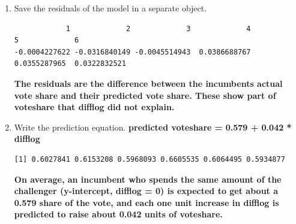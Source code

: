 \documentclass[12pt,letterpaper]{article}
\begin{document}
\begin{enumerate}
		\item Save the residuals of the model in a separate object.	

\begin{verbatim}
            1             2             3             4             5             6 
-0.0004227622 -0.0316840149 -0.0045514943  0.0386688767  0.0355287965  0.0322832521 
\end{verbatim}
\textbf{The residuals are the difference between the incumbents actual vote share and their predicted vote share. These show part of voteshare that difflog did not explain. }
		\item Write the prediction equation.
\textbf{predicted voteshare = 0.579 + 0.042 * difflog}

\begin{verbatim}
[1] 0.6027841 0.6153208 0.5968093 0.6605535 0.6064495 0.5934877
\end{verbatim}
\textbf{On average, an incumbent who spends the same amount of the challenger (y-intercept, difflog = 0) is expected to get about a 0.579 share of the vote, and each one unit increase in difflog is predicted to raise about 0.042 units of voteshare.}
	\end{enumerate}
	
\newpage
\end{document}
